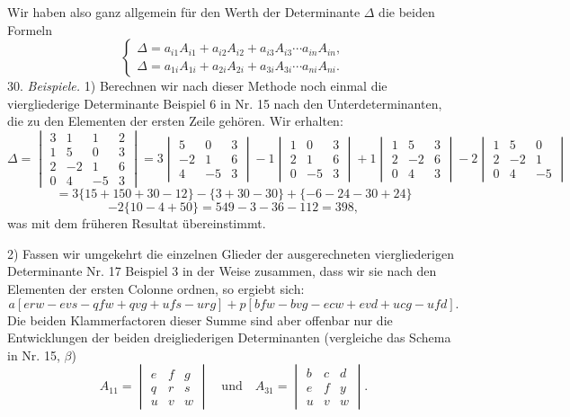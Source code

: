 \documentclass[11pt]{article}
\providecommand{\weq}[2]{\begin{equation}\tag{#1}#2\end{equation}}
\let\Delta\varDelta
\begin{document}
Wir haben also ganz allgemein für den Werth der Determinante $\Delta$ die
beiden Formeln
\weq{B}{
\left\{
\begin{array}{l}
\Delta = a_{i1}A_{i1}+a_{i2}A_{i2}+a_{i3}A_{i3}\cdots a_{in}A_{in}, \\
\Delta = a_{1i}A_{1i}+a_{2i}A_{2i}+a_{3i}A_{3i}\cdots a_{ni}A_{ni}.
\end{array}
\right.
}
30. \textit{Beispiele.} 1) Berechnen wir nach dieser Methode noch einmal die
viergliederige Determinante Beispiel 6 in Nr. 15 nach den
Unterdeterminanten, die zu den Elementen der ersten Zeile gehören. Wir
erhalten:
\[
\Delta=\begin{vmatrix} 3 & 1 & 1 & 2 \\ 1 & 5 & 0 & 3 \\ 2 & -2 & 1 & 6 \\ 0 & 4 & -5 & 3 \end{vmatrix}
=3\begin{vmatrix} 5 & 0 & 3 \\ -2 & 1 & 6 \\ 4 & -5 & 3 \end{vmatrix}
-1\begin{vmatrix} 1 & 0 & 3 \\ 2 & 1 & 6 \\ 0 & -5 & 3 \end{vmatrix}
+1\begin{vmatrix} 1 & 5 & 3 \\ 2 & -2 & 6 \\ 0 & 4 & 3 \end{vmatrix}
-2\begin{vmatrix} 1 & 5 & 0 \\ 2 & -2 & 1 \\ 0 & 4 & -5 \end{vmatrix}
\]
\[
=3\{15+150+30-12\}-\{3+30-30\}+\{-6-24-30+24\}
\]
\[
-2\{10-4+50\}=549-3-36-112=398,
\]
was mit dem früheren Resultat übereinstimmt.

2) Fassen wir umgekehrt die einzelnen Glieder der ausgerechneten
viergliederigen Determinante Nr. 17 Beispiel 3 in der Weise zusammen, dass
wir sie nach den Elementen der ersten Colonne ordnen, so ergiebt sich:
\[
a[erw-evs-qfw+qvg+ufs-urg] %
+p[bfw-bvg-ecw+evd+ucg-ufd].
\]
Die beiden Klammerfactoren dieser Summe sind aber offenbar nur die
Entwicklungen der beiden dreigliederigen Determinanten (vergleiche das
Schema in Nr. 15, $\beta$)
\[
A_{11}=\begin{vmatrix} e & f & g \\ q & r & s \\ u & v & w \end{vmatrix}
\quad \text{und} \quad
A_{31}=\begin{vmatrix} b & c & d \\ e & f & y \\ u & v & w \end{vmatrix}.
\]
\end{document}
